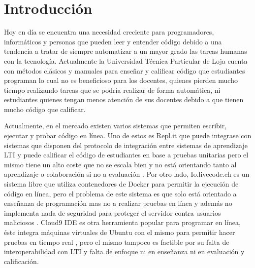 
\chapter{Introducción}
\label{capitulo1}

%


\newcommand{\keyword}[1]{\textbf{#1}}
\newcommand{\tabhead}[1]{\textbf{#1}}
\newcommand{\code}[1]{\texttt{#1}}
\newcommand{\file}[1]{\texttt{\bfseries#1}}
\newcommand{\option}[1]{\texttt{\itshape#1}}


Hoy en día se encuentra una necesidad creciente para programadores, informáticos y personas que pueden leer y entender código debido a una tendencia a tratar de siempre automatizar a un mayor grado las tareas humanas con la tecnología. Actualmente la Universidad Técnica Particular de Loja cuenta con métodos clásicos y manuales para enseñar y calificar código que estudiantes programan lo cual no es beneficioso para los docentes, quienes pierden mucho tiempo realizando tareas que se podría realizar de forma automática, ni estudiantes quienes tengan menos atención de sus docentes debido a que tienen mucho código que calificar.
 
Actualmente, en el mercado existen varios sistemas que permiten escribir, ejecutar y probar código en línea. Uno de estos es Repl.it que puede integrase con sistemas que disponen del protocolo de integración entre sistemas de aprendizaje LTI  \citep{Repl.it-Home} y puede calificar el código de estudiantes en base a pruebas unitarias pero el mismo tiene un alto coste que no se escala bien y no está orientando tanto al aprendizaje o colaboración si no a evaluación \citep{Lopez-Jorge}. Por otro lado, Io.livecode.ch es un sistema libre que utiliza contenedores de Docker para permitir la ejecución de código en línea, pero el problema de este sistema es que solo está orientado a enseñanza de programación mas no a realizar pruebas en línea y además no implementa nada de seguridad para proteger el servidor contra usuarios maliciosos \citep{io.livecode.ch}. Cloud9 IDE es otra herramienta popular para programar en línea, éste integra máquinas virtuales de Ubuntu con el mismo para permitir hacer pruebas en tiempo real \citep{Cloud9-Home}, pero el mismo tampoco es factible por su falta de interoperabilidad con LTI  y falta de enfoque ni en enseñanza ni en evaluación y calificación. 
 
